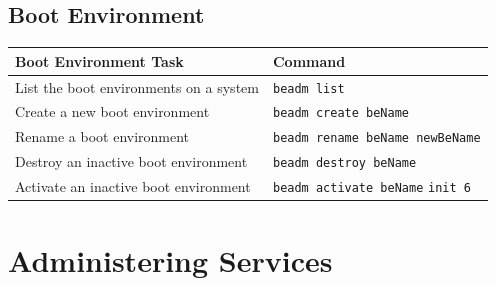 \documentclass[10pt,a4paper,twoside]{report}
\begin{document}
\section{Boot Environment}
\begin{table}
\begin{tabular}{|p{}|p{}|}
\hline
\rowcolor{LightBlue}%
\textbf{Boot Environment Task} & \textbf{Command}\\
\hline
\rowcolor{LightYellow}
List the boot environments on a system & \verb+beadm list+\\
\hline
\rowcolor{LightYellow}
Create a new boot environment & \verb+beadm create beName+\\
\hline
\rowcolor{LightYellow}
Rename a boot environment & \verb+beadm rename beName newBeName+\\
\hline
\rowcolor{LightYellow}
Destroy an inactive boot environment & \verb+beadm destroy beName+\\
\hline
\rowcolor{LightYellow}
Activate an inactive boot environment & {\verb+beadm activate beName+} {\verb+init 6+} \\
\hline
\end{tabular}
\end{table}

\chapter{Administering Services}
\end{document}
